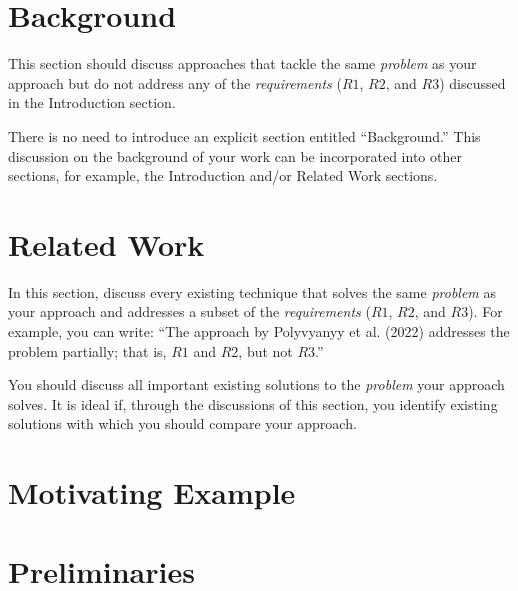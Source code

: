 \section{Background}
\label{sec:background}

This section should discuss approaches that tackle the same \emph{problem} as your approach but do not address any of the \emph{requirements} ($R1$, $R2$, and $R3$) discussed in the Introduction section.

There is no need to introduce an explicit section entitled ``Background.''
This discussion on the background of your work can be incorporated into other sections, for example, the Introduction and/or Related Work sections.

\section{Related Work}
\label{sec:related:work}

In this section, discuss every existing technique that solves the same \emph{problem} as your approach and addresses a subset of the \emph{requirements} ($R1$, $R2$, and $R3$).
For example, you can write: ``The approach by Polyvyanyy et al. (2022) addresses the problem partially; that is, $R1$ and $R2$, but not $R3$.''

You should discuss all important existing solutions to the \emph{problem} your approach solves.
It is ideal if, through the discussions of this section, you identify existing solutions with which you should compare your approach.

\section{Motivating Example}
\label{sec:motivating:example}

\section{Preliminaries}
\label{sec:preliminaries}

